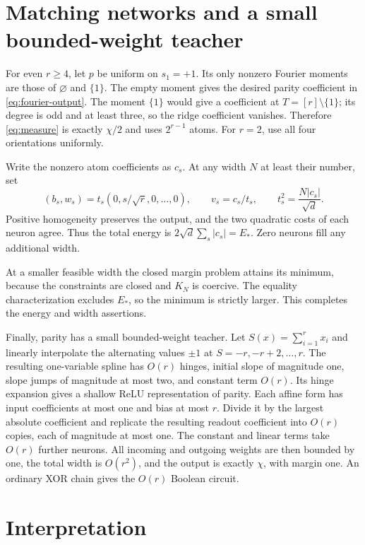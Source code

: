 \documentclass[11pt]{article}
\begin{document}
\section{Matching networks and a small bounded-weight teacher}

For even $r\ge4$, let $p$ be uniform on $s_1=+1$. Its only nonzero
Fourier moments are those of $\varnothing$ and $\{1\}$. The empty
moment gives the desired parity coefficient in
\eqref{eq:fourier-output}. The moment $\{1\}$ would give a coefficient
at $T=[r]\setminus\{1\}$; its degree is odd and at least three, so the
ridge coefficient vanishes. Therefore \eqref{eq:measure} is exactly
$\chi/2$ and uses $2^{r-1}$ atoms. For $r=2$, use all four orientations
uniformly.

Write the nonzero atom coefficients as $c_s$. At any width $N$ at least
their number, set
\[
 (b_s,w_s)=t_s(0,s/\sqrt r,0,\ldots,0),\qquad
 v_s=c_s/t_s,\qquad t_s^2=\frac{N|c_s|}{\sqrt d}.
\]
Positive homogeneity preserves the output, and the two quadratic costs
of each neuron agree. Thus the total energy is
$2\sqrt d\sum_s|c_s|=E_*$. Zero neurons fill any additional width.

At a smaller feasible width the closed margin problem attains its
minimum, because the constraints are closed and $K_N$ is coercive.
The equality characterization excludes $E_*$, so the minimum is
strictly larger. This completes the energy and width assertions.

Finally, parity has a small bounded-weight teacher. Let
$S(x)=\sum_{i=1}^r x_i$ and linearly interpolate the alternating values
$\pm1$ at $S=-r,-r+2,\ldots,r$. The resulting one-variable spline has
$O(r)$ hinges, initial slope of magnitude one, slope jumps of magnitude
at most two, and constant term $O(r)$. Its hinge expansion gives a
shallow ReLU representation of parity. Each affine form has input
coefficients at most one and bias at most $r$. Divide it by the largest
absolute coefficient and replicate the resulting readout coefficient
into $O(r)$ copies, each of magnitude at most one. The constant and
linear terms take $O(r)$ further neurons. All incoming and outgoing
weights are then bounded by one, the total width is $O(r^2)$, and the
output is exactly $\chi$, with margin one. An ordinary XOR chain gives
the $O(r)$ Boolean circuit.

\section{Interpretation}
\end{document}

